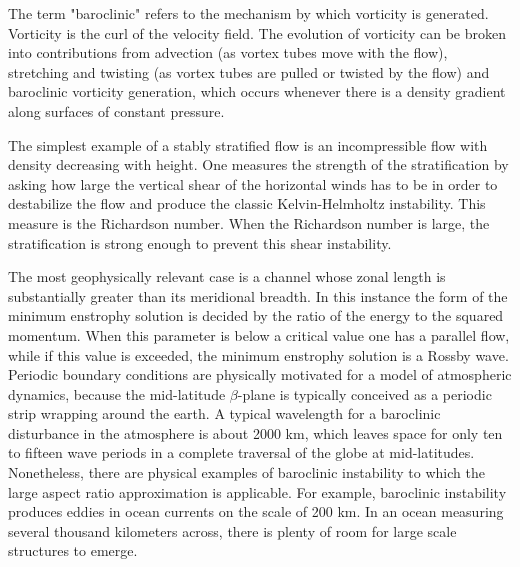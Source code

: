 The term "baroclinic" refers to the mechanism by which vorticity is
generated. Vorticity is the curl of the velocity field. The
evolution of vorticity can be broken into contributions from advection
(as vortex tubes move with the flow), stretching and twisting (as vortex
tubes are pulled or twisted by the flow) and baroclinic vorticity
generation, which occurs whenever there is a density gradient along
surfaces of constant pressure.



The simplest example of a stably stratified flow is an incompressible
flow with density decreasing with height. One measures the strength of
the stratification by asking how large the vertical shear of the
horizontal winds has to be in order to destabilize the flow and produce
the classic Kelvin-Helmholtz instability. This measure is the Richardson
number. When the Richardson number is large, the stratification is strong
enough to prevent this shear instability.

The most
geophysically relevant case is a channel whose zonal length is
substantially greater than its meridional breadth. In this instance the
form of the minimum enstrophy solution is decided by the ratio of the
energy to the squared momentum. When this parameter is below a critical
value one has a parallel flow, while if this value is exceeded, the
minimum enstrophy solution is a Rossby wave.
Periodic boundary conditions
are physically motivated for a model of atmospheric dynamics, because the
mid-latitude $\beta$-plane is typically conceived as a periodic strip wrapping
around the earth. A typical wavelength for a baroclinic disturbance in
the atmosphere is about 2000 km, which leaves space for only ten to
fifteen wave periods in a complete traversal of the globe at
mid-latitudes. Nonetheless, there are physical examples of baroclinic
instability to which the large aspect ratio approximation is applicable.
For example, baroclinic instability produces eddies in ocean currents on
the scale of 200 km. In an ocean measuring several thousand kilometers
across, there is plenty of room for large scale structures to emerge.



